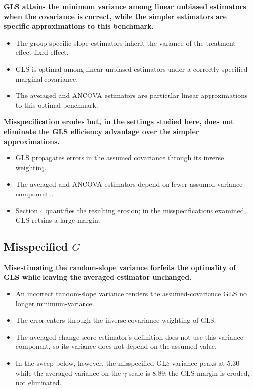\documentclass[
  11pt,
]{article}
\begin{document}
\textbf{GLS attains the minimum variance among linear unbiased estimators when the covariance is correct, while the simpler estimators are specific approximations to this benchmark.}

\begin{itemize}\setlength{\itemsep}{2pt}\setlength{\parskip}{0pt}
\item The group-specific slope estimators inherit the variance of the treatment-effect fixed effect.
\item GLS is optimal among linear unbiased estimators under a correctly specified marginal covariance.
\item The averaged and ANCOVA estimators are particular linear approximations to this optimal benchmark.
\end{itemize}

\textbf{Misspecification erodes but, in the settings studied here, does not eliminate the GLS efficiency advantage over the simpler approximations.}

\begin{itemize}\setlength{\itemsep}{2pt}\setlength{\parskip}{0pt}
\item GLS propagates errors in the assumed covariance through its inverse weighting.
\item The averaged and ANCOVA estimators depend on fewer assumed variance components.
\item Section 4 quantifies the resulting erosion; in the misspecifications examined, GLS retains a large margin.
\end{itemize}

\subsection{\texorpdfstring{Misspecified \(G\)}{Misspecified G}}\label{misspecified-g}

\textbf{Misestimating the random-slope variance forfeits the optimality of GLS while leaving the averaged estimator unchanged.}

\begin{itemize}\setlength{\itemsep}{2pt}\setlength{\parskip}{0pt}
\item An incorrect random-slope variance renders the assumed-covariance GLS no longer minimum-variance.
\item The error enters through the inverse-covariance weighting of GLS.
\item The averaged change-score estimator's definition does not use this variance component, so its variance does not depend on the assumed value.
\item In the sweep below, however, the misspecified GLS variance peaks at 5.30 while the averaged variance on the $\gamma$ scale is 8.89: the GLS margin is eroded, not eliminated.
\end{itemize}
\end{document}
